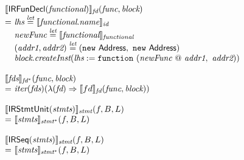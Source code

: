 \vspace*{-2em}
\[
\begin{array}{l@{}l@{~}l}
\lefteqn{\transfun{\IRFunDecl(\emph{functional})}_{\emph{fd}}(\emph{func}, \emph{block})}\\
& = & \emph{lhs} \letval \transfun{\emph{functional}.\emph{name}}_{\emph{id}}\\
& & \emph{newFunc} \letval \transfun{\emph{functional}}_{\emph{functional}}\\
& & (\emph{addr1}, \emph{addr2}) \letval (\new\ \Address,\ \new\ \Address)\\
& & \emph{block}.\emph{createInst}(\emph{lhs} := \TT{function}\ (\emph{newFunc} ~@~ \emph{addr1},\ \emph{addr2}))\\
& & \\

\lefteqn{\transfun{\emph{fds}}_{\emph{fd}^{*}}(\emph{func}, \emph{block})}\\
& = & \iter(\emph{fds})(\lambda(\emph{fd}) \Rightarrow \transfun{fd}_{\emph{fd}}(\emph{func}, \emph{block}))\\
& & \\

\lefteqn{\transfun{\irstmtunit{\emph{stmts}}}_{\emph{stmt}}(f, B, L)}\\
 & = &
\transfun{\emph{stmts}}_{\emph{stmt}^{*}}(f, B, L)\\
& & \\

\lefteqn{\transfun{\irseq{\emph{stmts}}}_{\emph{stmt}}(f, B, L)}\\
 & = &
\transfun{\emph{stmts}}_{\emph{stmt}^{*}}(f, B, L)\\
& & \\


\end{array}\]
